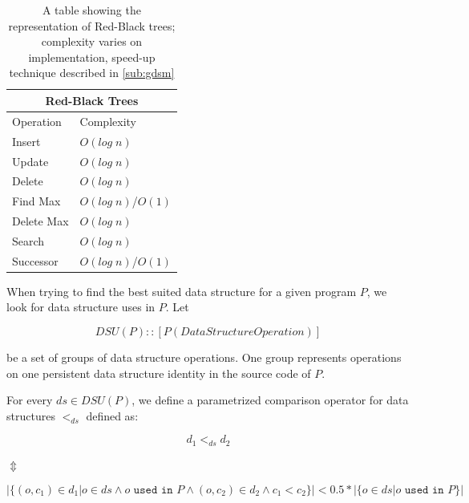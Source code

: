 \documentclass[a4paper,11pt]{article}
\begin{document}
		\begin{table}[h!]
			\centering
			\begin{tabular}{|l|l|}
				\hline
				\multicolumn{2}{|c|}{Red-Black Trees} \\
				\hline
				Operation & Complexity \\
				\hline
				Insert 	        & $O(log \; n)$ \\
				Update          & $O(log \; n)$ \\
				Delete	        & $O(log \; n)$ \\
				Find Max 	& $O(log \; n)$/$O(1)$\\
				Delete Max	& $O(log \; n)$ \\
				Search 		& $O(log \; n)$ \\
				Successor 	& $O(log \; n)$/$O(1)$\\
				\hline
			\end{tabular}
			\caption{A table showing the representation of Red-Black trees; complexity varies on
			implementation, speed-up technique described in \autoref{sub:gdsm}}
			\label{tab:rbt}
		\end{table}

		When trying to find the best suited data structure for a given program $P$, we look for data structure
		uses in $P$. Let

		\begin{equation} \label{dsu-type}
			DSU(P) :: [P(DataStructureOperation)]
		\end{equation}

		be a set of groups of data structure operations. One group represents operations on one persistent
        data structure identity in the source code of $P$.

		For every $ds \in DSU(P)$, we define a parametrized comparison operator for data structures $<_{ds}$
		defined as:

		\begin{center}

			\begin{equation}
				d_1 <_{ds} d_2
			\end{equation}

			$\Updownarrow$

			\begin{equation} \label{data-structure-order}
|\{(o, c_1) \in d_1 | o \in ds \wedge o \texttt{ used in $P$} \wedge (o,c_2) \in d_2 \wedge c_1 < c_2 \}| < 0.5 *
 |\{o \in ds | o \texttt{ used in $P$} \}|
			\end{equation}

		\end{center}
\end{document}

